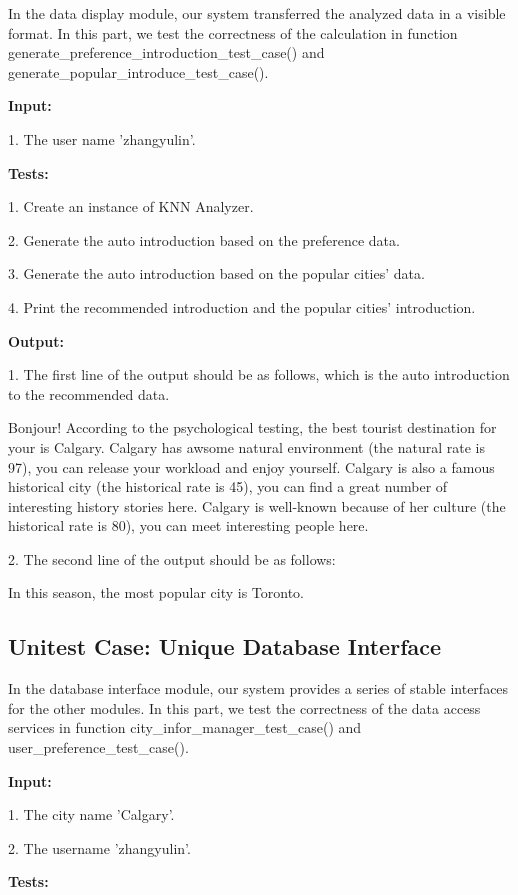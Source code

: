 \documentclass[conference]{IEEEtran}
\begin{document}
In the data display module, our system transferred the analyzed data in a visible format. In this part, we test the correctness of the calculation in function generate\_preference\_introduction\_test\_case() and generate\_popular\_introduce\_test\_case().

 \textbf{ Input: }

1. The user name 'zhangyulin'.


 \textbf{ Tests: }

1. Create an instance of KNN Analyzer.

2. Generate the auto introduction based on the preference data.

3. Generate the auto introduction based on the popular cities' data.

4. Print the recommended introduction and the popular cities' introduction.

 \textbf{ Output: }

1. The first line of the output should be as follows, which is the auto introduction to the recommended data.

Bonjour! According to the psychological testing, the best tourist destination for your is Calgary. Calgary has awsome natural environment (the natural rate is 97), you can release your workload and enjoy yourself. Calgary is also a famous historical city (the historical rate is 45), you can find a great number of interesting history stories here. Calgary is well-known because of her culture (the historical rate is 80), you can meet interesting people here. 


2. The second line of the output should be as follows:

In this season, the most popular city is Toronto. 


\subsection{ \textbf{ Unitest Case: Unique Database Interface }}


In the database interface module, our system provides a series of stable interfaces for the other modules. In this part, we test the correctness of the data access services in function city\_infor\_manager\_test\_case() and user\_preference\_test\_case().


 \textbf{ Input: }

1. The city name 'Calgary'.

2. The username 'zhangyulin'.

 \textbf{ Tests: }
\end{document}

